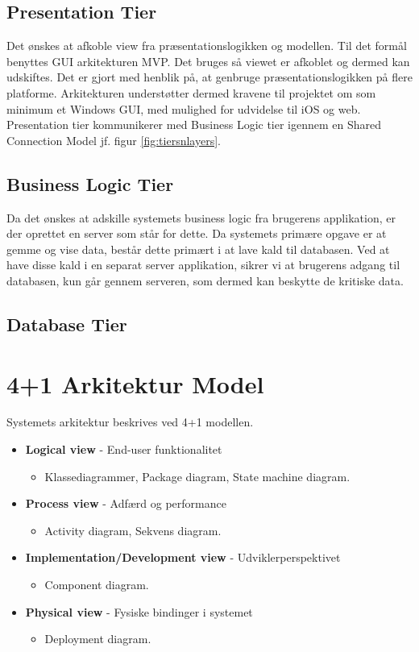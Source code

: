 \subsection{Presentation Tier}
Det ønskes at afkoble view fra præsentationslogikken og modellen. Til det formål benyttes GUI arkitekturen MVP. Det bruges så viewet er afkoblet og dermed kan udskiftes. Det er gjort med henblik på, at genbruge præsentationslogikken på flere platforme. Arkitekturen understøtter dermed kravene til projektet om som minimum et Windows GUI, med mulighed for udvidelse til iOS og web. Presentation tier kommunikerer med Business Logic tier igennem en Shared Connection Model jf. figur \ref{fig:tiersnlayers}. 

\subsection{Business Logic Tier}
Da det ønskes at adskille systemets business logic fra brugerens applikation, er der oprettet en server som står for dette. Da systemets primære opgave er at gemme og vise data, består dette primært i at lave kald til databasen. Ved at have disse kald i en separat server applikation, sikrer vi at brugerens adgang til databasen, kun går gennem serveren, som dermed kan beskytte de kritiske data.

\subsection{Database Tier}

\section{4+1 Arkitektur Model}
Systemets arkitektur beskrives ved 4+1 modellen. 



\begin{itemize}
	\item \textbf{Logical view} - End-user funktionalitet
	\begin{itemize}
		\item Klassediagrammer, Package diagram, State machine diagram.
	\end{itemize}
	\item \textbf{Process view} - Adfærd og performance
	\begin{itemize}
		\item Activity diagram, Sekvens diagram.
	\end{itemize}
	\item \textbf{Implementation/Development view} - Udviklerperspektivet
	\begin{itemize}
		\item Component diagram.
	\end{itemize}
	\item \textbf{Physical view} - Fysiske bindinger i systemet
	\begin{itemize}
		\item Deployment diagram.
	\end{itemize}
\end{itemize}

